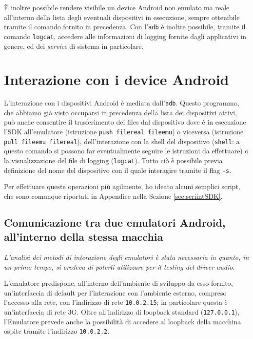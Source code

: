 È inoltre possibile rendere visibile un device Android non emulato ma reale
all'interno della lista degli eventuali dispositivi in esecuzione, sempre
ottenibile tramite il comando fornito in precedenza. Con l'\texttt{\small adb}
è inoltre possibile, tramite il comando \texttt{\small logcat}, accedere alle informazioni
di logging fornite dagli applicativi in genere, ed dei \textit{service} di sistema
in particolare.

\section{Interazione con i device Android}\label{sec:intdevandroid}
L'interazione con i dispositivi Android è mediata dall'\texttt{\small{adb}}. Questo
programma, che abbiamo già visto occuparsi in precedenza della lista dei dispositivi
attivi, può anche consentire il trasferimento dei files dal dispositivo dove è 
in esecuzione l'SDK all'emulatore (istruzione \texttt{\small{push filereal fileemu}})
o viceversa (istruzione \texttt{\small{pull fileemu filereal}}), dell'interazione
con la shell del dispositivo (\texttt{\small shell}: a questo comando si possono far
eventualmente seguire le istruzioni da effettuare) o la visualizzazione del
file di logging (\texttt{\small logcat}). Tutto ciò è possibile previa definizione
del nome del dispositivo con il quale interagire tramite il flag \texttt{\small{-s}}.

Per effettuare queste operazioni più agilmente, ho ideato alcuni semplici script,
che sono comunque riportati in Appendice nella Sezione \vref{sec:scriintSDK}.

\subsection{Comunicazione tra due emulatori Android, all'interno della stessa macchia}\label{subsec:commtwoemu}
\textit{L'analisi dei metodi di interazione degli emulatori è stata necessaria
in quanto, in un primo tempo, si credeva di poterli utilizzare per il testing
del driver audio}.

L'emulatore predispone, all'interno dell'ambiente di sviluppo da esso fornito, 
un'interfaccia di default per l'interazione con l'ambiente esterno, compreso 
l'accesso alla rete, con l'indirizzo di rete \texttt{\small 10.0.2.15}; in 
particolare questa è un'interfaccia di rete 3G. Oltre all'indirizzo di loopback
standard (\texttt{\small 127.0.0.1}), l'Emulatore prevede anche la possibilità 
di accedere al loopback della macchina ospite tramite l'indirizzo \texttt{\small 10.0.2.2}.

